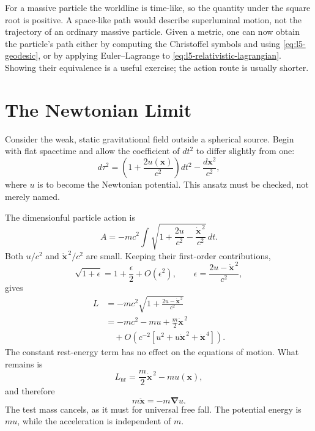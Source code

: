 For a massive particle the worldline is time-like, so the quantity under the
square root is positive.  A space-like path would describe superluminal
motion, not the trajectory of an ordinary massive particle.  Given a metric,
one can now obtain the particle's path either by computing the Christoffel
symbols and using \eqref{eq:l5-geodesic}, or by applying Euler--Lagrange to
\eqref{eq:l5-relativistic-lagrangian}.  Showing their equivalence is a useful
exercise; the action route is usually shorter.

\section{The Newtonian Limit}

Consider the weak, static gravitational field outside a spherical source.
Begin with flat spacetime and allow the coefficient of \(dt^2\) to differ
slightly from one:
\begin{equation}
d\tau^2
=\left(1+\frac{2u(\mathbf{x})}{c^2}\right)dt^2
-\frac{d\mathbf{x}^2}{c^2},
\label{eq:l5-weak-metric}
\end{equation}
where \(u\) is to become the Newtonian potential.  This ansatz must be checked,
not merely named.

The dimensionful particle action is
\begin{equation}
A=-mc^2\int
\sqrt{1+\frac{2u}{c^2}
-\frac{\dot{\mathbf{x}}^{\,2}}{c^2}}\,dt.
\label{eq:l5-weak-action}
\end{equation}
Both \(u/c^2\) and \(\dot{\mathbf{x}}^{\,2}/c^2\) are small.  Keeping their
first-order contributions,
\begin{equation}
\sqrt{1+\epsilon}
=1+\frac{\epsilon}{2}+O(\epsilon^2),
\qquad
\epsilon=\frac{2u-\dot{\mathbf{x}}^{\,2}}{c^2},
\end{equation}
gives
\begin{align}
L
&=-mc^2
\sqrt{1+\frac{2u-\dot{\mathbf{x}}^{\,2}}{c^2}}\\
&=-mc^2-mu+\frac{m}{2}\dot{\mathbf{x}}^{\,2}\\
&\quad+O\!\left(c^{-2}
 [u^2+u\dot{\mathbf{x}}^{\,2}+\dot{\mathbf{x}}^{\,4}]\right).
\label{eq:l5-newton-expansion}
\end{align}
The constant rest-energy term has no effect on the equations of motion.  What
remains is
\begin{equation}
L_{\mathrm{nr}}
=\frac{m}{2}\dot{\mathbf{x}}^{\,2}-m u(\mathbf{x}),
\label{eq:l5-newton-lagrangian}
\end{equation}
and therefore
\begin{equation}
m\ddot{\mathbf{x}}=-m\boldsymbol{\nabla}u.
\label{eq:l5-newton-equation}
\end{equation}
The test mass cancels, as it must for universal free fall.  The potential
energy is \(m u\), while the acceleration is independent of \(m\).

